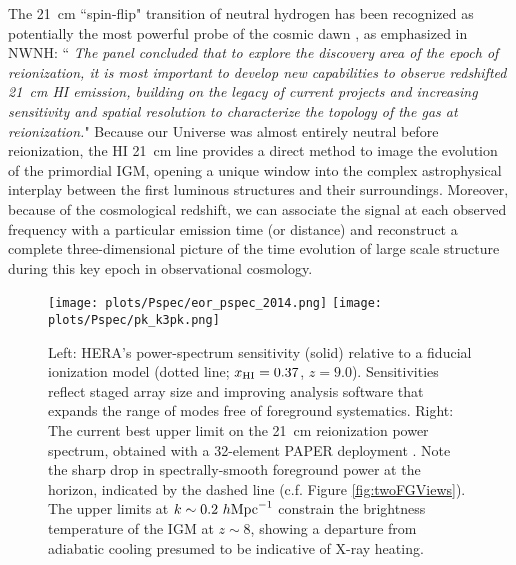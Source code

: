 \documentclass[preprint]{aastex}
\newcommand{\Mycitep}[1]{{\bf \citep{#1}}}
\newcommand{\Caption}[4]{\vspace{#1}\renewcommand{\baselinestretch}{#2}\caption{#4}\vspace{#3}}
\def\HI{{H{\small I }}}
\def\xHI{{x_{\rm\HI}}}
\begin{document}
The 21~cm ``spin-flip" transition of  neutral hydrogen has been recognized as potentially the most powerful probe 
of the cosmic dawn \Mycitep{morales_wyithe2010, furlanetto_et_al2006}, as emphasized in NWNH: 
``{\it 
The panel concluded that  to explore the discovery area of the epoch of reionization, it is most important to 
develop new capabilities to observe redshifted 21~cm \HI emission, building on the legacy of current projects and 
increasing sensitivity and spatial resolution to characterize the topology of the gas at reionization.}"  Because 
our Universe was almost entirely neutral before reionization, the HI 21~cm line provides a direct method to image 
the evolution of the primordial IGM, opening a unique window into the complex astrophysical interplay between the 
first luminous structures and their surroundings. Moreover, because of the cosmological redshift, we can associate 
the signal at each observed frequency with a particular emission time (or distance) and reconstruct a complete 
three-dimensional picture of the time evolution of large scale structure during this key epoch in 
observational cosmology. 

\begin{figure}[t]\centering
\texttt{[image: plots/Pspec/eor\_pspec\_2014.png]}
\texttt{[image: plots/Pspec/pk\_k3pk.png]} 
\Caption{-0.1in}{0.99}{-0.2in}{\small Left: HERA's power-spectrum sensitivity (solid)
relative to a fiducial ionization model (dotted line; $\xHI=0.37$, $z=9.0$).
Sensitivities reflect staged array size and
improving analysis software that expands the range
of modes free of foreground systematics.
Right: The current best upper limit on the 21~cm reionization power spectrum,
obtained with a 32-element PAPER deployment \Mycitep{parsons_et_al2013}.  Note the sharp drop in spectrally-smooth foreground power at the horizon, indicated by the dashed line (c.f. Figure \ref{fig:twoFGViews}).  The upper limits at $k\sim0.2~h\rm{Mpc}^{-1}$
constrain the brightness temperature of the IGM at $z\sim8$, showing
a departure from adiabatic cooling presumed to be indicative of X-ray heating.
}\label{fig:eor_pspec}
\end{figure}
\end{document}
